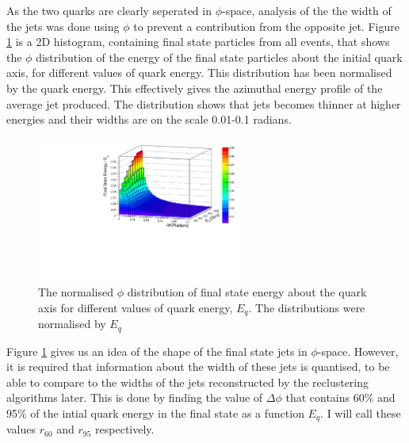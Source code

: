 \documentclass[a4paper,11pt, onecolumn]{article}
\begin{document}
  \vspace{-0.4cm}

  As the two quarks are clearly seperated in $\phi$-space, analysis of the the width of the jets was done using $\phi$ to prevent a contribution from the opposite jet. 
  Figure \ref{lego_plot} is a 2D histogram, containing final state particles from all events, that shows the $\phi$ distribution of the energy of the final state
  particles about the initial quark axis, for different values of quark energy. This distribution has been normalised by the quark energy.
  This effectively gives the azimuthal energy profile of the average jet produced. The distribution shows that jets becomes thinner at higher energies and 
  their widths are on the scale 0.01-0.1 radians. \\
  
 \begin{figure}[ht]
    \begin{center}
      \includegraphics[width = 0.6\textwidth]{lego_plot}
      \caption{The normalised $\phi$ distribution of final state energy about the quark axis for different values of quark energy, $E_{q}$.
               The distributions were normalised by $E_{q}$}
      \label{lego_plot}
    \end{center}
  \end{figure}

 
 \vspace{-0.15cm}
  Figure \ref{lego_plot} gives us an idea of the shape of the final state jets in $\phi$-space. However, it is required that information about the width of these 
  jets is quantised, to be able to compare to the widths of the jets reconstructed by the reclustering algorithms later. This is done by finding the value of 
  $\Delta\phi$ that contains 60\% and 95\% of the intial quark energy in the final state as a function $E_{q}$. I will call these values $r_{60}$ and $r_{95}$ 
  respectively. \\
  
\end{document}

